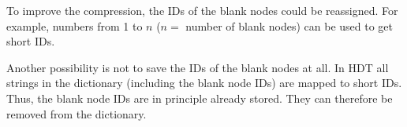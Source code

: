 To improve the compression, the IDs of the blank nodes could be reassigned. For example, numbers from 1 to $n$ ($n=$ number of blank nodes) can be used to get short IDs. 

Another possibility is not to save the IDs of the blank nodes at all. In HDT all strings in the dictionary (including the blank node IDs) are mapped to short IDs. Thus, the blank node IDs are in principle already stored. They can therefore be removed from the dictionary. 















